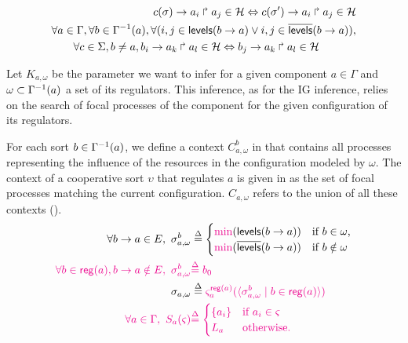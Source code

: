 \begin{property}
{\begin{align*}
\begin{split}
    c(\sigma)\rightarrow a_i\Rsh a_j \in \mathcal{H} \Leftrightarrow
    c(\sigma')\rightarrow a_i\Rsh a_j \in \mathcal{H}
  \end{split}\\
  \begin{split}
    & \forall a \in \Gamma, \forall b \in \Gamma^{-1}(a),
      \forall (i,j \in \mathsf{levels}(b\rightarrow a) \vee i,j \in \overline{\mathsf{levels}}(b\rightarrow a)), \\
    & \qquad \forall c \in \Sigma, b \neq a,
      b_i\rightarrow a_k\Rsh a_l \in \mathcal{H} \Leftrightarrow
      b_j\rightarrow a_k\Rsh a_l \in \mathcal{H}
  \end{split}
\end{align*}
}
\end{property}

Let $K_{a,\omega}$ be the parameter we want to infer for a given component $a \in \Gamma$
and $\omega \subset \Gamma^{-1}(a)$ a set of its regulators.
This inference, as for the IG inference, relies on the search of focal processes of the component for the given configuration of its regulators.

For each sort $b \in \Gamma^{-1}(a)$, we define a context $C^b_{a,\omega}$ in  that contains all processes representing the influence of the resources in the configuration modeled by $\omega$.
The context of a cooperative sort $\upsilon$ that regulates $a$ is given in
 as the set of focal processes matching the current configuration.
$C_{a,\omega}$ refers to the union of all these contexts ().
\begin{align}
  \label{eq:param_context}
  \forall b\rightarrow a\in E,~
  \sigma_{a,\omega}^b & \stackrel{\Delta}= \begin{cases}
    \textcolor{magenta}{\min}(\mathsf{levels}(b\rightarrow a)) & \text{if $b \in \omega$,}\\
    \textcolor{magenta}{\min}(\overline{\mathsf{levels}}(b\rightarrow a)) & \text{if $b \notin \omega$}
  \end{cases}
  \\
  \textcolor{magenta}{
  \forall b\in\mathsf{reg}({a}), b\rightarrow a\notin E,~
  \sigma_{a,\omega}^b} & \textcolor{magenta}{\stackrel{\Delta}= b_0}
  \\
  \sigma_{a,\omega} & \stackrel{\Delta}=
  \textcolor{magenta}{\varsigma_a^{\mathsf{reg}({a})}(
  	\langle \sigma^b_{a,\omega} \mid  b\in\mathsf{reg}({a}) \rangle)}
  \label{eq:K-ctx}
  \\
  \textcolor{magenta}{
  \forall a\in\Gamma,~
  S_a(\varsigma)} &\textcolor{magenta}{\stackrel{\Delta}=
	\begin{cases}
	\{a_i\} & \text{if }a_i\in \varsigma\\
	L_a & \text{otherwise.}
	\end{cases}}
\end{align}

